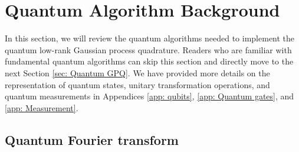 \documentclass[10pt]{article}
\begin{document}
	
	\section{\label{sec: Quantum algorithms}Quantum Algorithm Background}
	
	In this section, we will review the quantum algorithms needed to implement the quantum low-rank Gaussian process quadrature. Readers who are familiar with fundamental quantum algorithms can skip this section and directly move to the next Section \ref{sec: Quantum GPQ}. We have provided more details on the representation of quantum states, unitary transformation operations, and quantum measurements in  Appendices \ref{app: qubits}, \ref{app: Quantum gates}, and \ref{app: Measurement}. 
	\subsection{\label{sec: QFT}Quantum Fourier transform}
	
\end{document}
